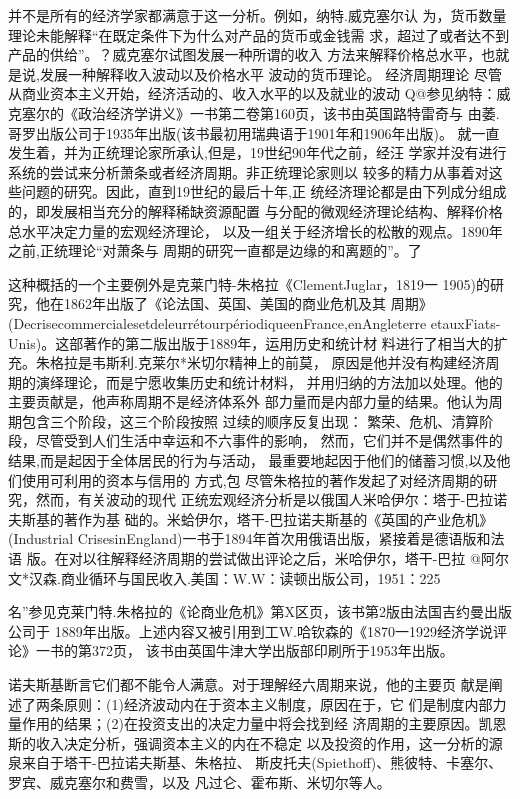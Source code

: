 并不是所有的经济学家都满意于这一分析。例如，纳特.威克塞尔认
为，货币数量理论未能解释“在既定条件下为什么对产品的货币或金钱需
求，超过了或者达不到产品的供给”。？威克塞尔试图发展一种所谓的收入
方法来解释价格总水平，也就是说,发展一种解释收入波动以及价格水平
波动的货币理论。
经济周期理论
尽管从商业资本主义开始，经济活动的、收入水平的以及就业的波动
Q@参见纳特：威克塞尔的《政治经济学讲义》一书第二卷第160页，该书由英国路特雷奇与
由萎.哥罗出版公司于1935年出版(该书最初用瑞典语于1901年和1906年出版)。
就一直发生着，并为正统理论家所承认,但是，19世纪90年代之前，经汪
学家并没有进行系统的尝试来分析萧条或者经济周期。非正统理论家则以
较多的精力从事着对这些问题的研究。因此，直到19世纪的最后十年,正
统经济理论都是由下列成分组成的，即发展相当充分的解释稀缺资源配置
与分配的微观经济理论结构、解释价格总水平决定力量的宏观经济理论，
以及一组关于经济增长的松散的观点。1890年之前,正统理论“对萧条与
周期的研究一直都是边缘的和离题的”。了

这种概括的一个主要例外是克莱门特-朱格拉《ClementJuglar，1819一
1905)的研究，他在1862年出版了《论法国、英国、美国的商业危机及其
周期》(DecrisecommercialesetdeleurrétourpériodiqueenFrance,enAngleterre
etauxFiats-Unis)。这部著作的第二版出版于1889年，运用历史和统计材
料进行了相当大的扩充。朱格拉是韦斯利.克莱尔*米切尔精神上的前莫，
原因是他并没有构建经济周期的演绎理论，而是宁愿收集历史和统计材料，
并用归纳的方法加以处理。他的主要贡献是，他声称周期不是经济体系外
部力量而是内部力量的结果。他认为周期包含三个阶段，这三个阶段按照
过续的顺序反复出现：
繁荣、危机、清算阶段，尽管受到人们生活中幸运和不六事件的影响，
然而，它们并不是偶然事件的结果,而是起因于全体居民的行为与活动，
最重要地起因于他们的储蓄习惯,以及他们使用可利用的资本与信用的
方式,包
尽管朱格拉的著作发起了对经济周期的研究，然而，有关波动的现代
正统宏观经济分析是以俄国人米哈伊尔：塔于-巴拉诺夫斯基的著作为基
础的。米蛤伊尔，塔干-巴拉诺夫斯基的《英国的产业危机》(Industrial
CrisesinEngland)一书于1894年首次用俄语出版，紧接着是德语版和法语
版。在对以往解释经济周期的尝试做出评论之后，米哈伊尔，塔干-巴拉
@阿尔文*汉森.商业循环与国民收入.美国：W.W：读顿出版公司，1951：225

名”参见克莱门特.朱格拉的《论商业危机》第X区页，该书第2版由法国吉约曼出版公司于
1889年出版。上述内容又被引用到工W.哈钦森的《1870一1929经济学说评论》一书的第372页，
该书由英国牛津大学出版部印刷所于1953年出版。

诺夫斯基断言它们都不能令人满意。对于理解经六周期来说，他的主要页
献是阐述了两条原则：(1)经济波动内在于资本主义制度，原因在于，它
们是制度内部力量作用的结果；(2)在投资支出的决定力量中将会找到经
济周期的主要原因。凯恩斯的收入决定分析，强调资本主义的内在不稳定
以及投资的作用，这一分析的源泉来自于塔干-巴拉诺夫斯基、朱格拉、
斯皮托夫(Spiethoff)、熊彼特、卡塞尔、罗宾、威克塞尔和费雪，以及
凡过仑、霍布斯、米切尔等人。

